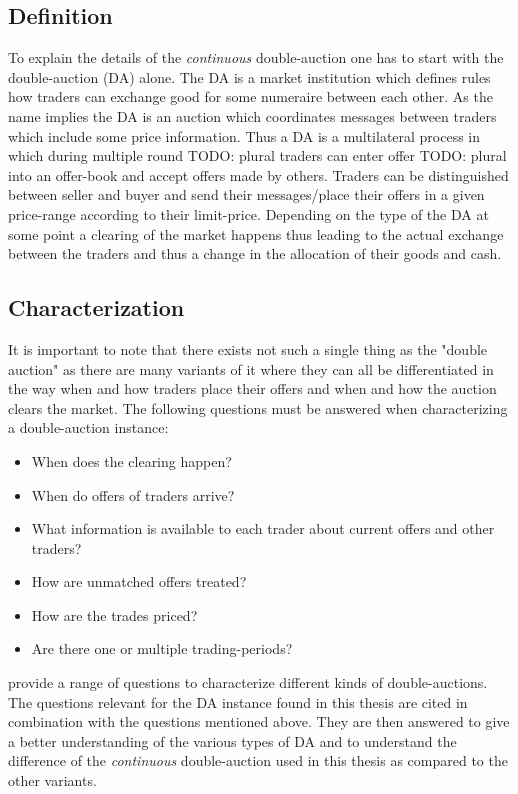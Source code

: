 \documentclass[../Bachelorarbeit.tex]{subfiles}
\begin{document}
\subsection{Definition}
To explain the details of the \textit{continuous} double-auction one has to start with the double-auction (DA) alone. The DA is a \gls{market institution} which defines rules how traders can exchange \gls{good} for some \gls{numeraire} between each other. As the name implies the DA is an \gls{auction} which coordinates messages between traders which include some price information. Thus a DA is a multilateral process in which during multiple \gls{round} TODO: plural traders can enter \gls{offer} TODO: plural into an \gls{offer-book} and accept offers made by others. Traders can be distinguished between \gls{seller} and \gls{buyer} and send their messages/place their offers in a given price-range according to their \gls{limit-price}. Depending on the type of the DA at some point a \gls{clearing} of the market happens thus leading to the actual exchange between the traders and thus a change in the allocation of their goods and cash. 

\subsection{Characterization}

It is important to note that there exists not such a single thing as the "double auction" as there are many variants of it where they can all be differentiated in the way when and how traders place their offers and when and how the auction clears the market. The following questions must be answered when characterizing a double-auction instance:

\begin{itemize}
\item When does the clearing happen?
\item When do offers of traders arrive?
\item What information is available to each trader about current offers and other traders?
\item How are unmatched offers treated?
\item How are the trades priced?
\item Are there one or multiple trading-periods?
\end{itemize}

\cite{Parsons2006} provide a range of questions to characterize different kinds of double-auctions. The questions relevant for the DA instance found in this thesis are cited in combination with the questions mentioned above. They are then answered to give a better understanding of the various types of DA and to understand the difference of the \textit{continuous} double-auction used in this thesis as compared to the other variants.
\end{document}
